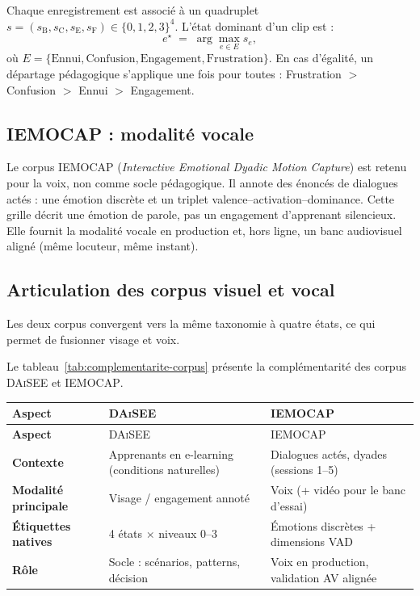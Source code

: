Chaque enregistrement est associé à un quadruplet
$s = (s_{\mathrm{B}}, s_{\mathrm{C}}, s_{\mathrm{E}}, s_{\mathrm{F}})
\in \{0,1,2,3\}^4$.
L'état dominant d'un clip est :
\begin{equation}
  e^{\star} \;=\; \arg\max_{e \in E} s_e,
  \label{eq:etat-dominant}
\end{equation}
où $E = \{\text{Ennui}, \text{Confusion}, \text{Engagement},
\text{Frustration}\}$. En cas d'égalité, un départage pédagogique
s'applique une fois pour toutes :
Frustration $>$ Confusion $>$ Ennui $>$ Engagement.



\subsection{\textsc{IEMOCAP} : modalité vocale}
\label{sec:iemocap}
\label{subsec:iemocap-desc}

Le corpus \textsc{IEMOCAP} (\emph{Interactive Emotional Dyadic Motion
Capture}) \cite{busso2008iemocap} est retenu pour la
voix, non comme socle pédagogique. Il annote des énoncés de
dialogues actés : une émotion discrète et un triplet
valence--activation--dominance. Cette grille décrit une émotion de
parole, pas un engagement d'apprenant silencieux. Elle fournit la
modalité vocale en production et, hors ligne, un banc audiovisuel
aligné (même locuteur, même instant). 

\subsection{Articulation des corpus visuel et vocal}
\label{subsec:iemocap-usage}

Les deux corpus convergent vers la même taxonomie à quatre états, ce qui
permet de fusionner visage et voix.

Le tableau~\ref{tab:complementarite-corpus} présente la complémentarité des corpus \textsc{DAiSEE} et \textsc{IEMOCAP}.

{\small
\renewcommand{\arraystretch}{1.18}
\setlength{\tabcolsep}{4pt}
\begin{xltabular}{\textwidth}{|>{\bfseries}l|X|X|}
\hline
{}
Aspect & \textsc{DAiSEE} & \textsc{IEMOCAP} \\
\hline
\endfirsthead
\hline
{}
Aspect & \textsc{DAiSEE} & \textsc{IEMOCAP} \\
\hline
\endhead
\endfoot
\endlastfoot
Contexte & Apprenants en e-learning (conditions naturelles) &
Dialogues actés, dyades (sessions 1--5) \\
\hline
Modalité principale & Visage / engagement annoté &
Voix (+ vidéo pour le banc d'essai) \\
\hline
Étiquettes natives & 4 états $\times$ niveaux 0--3 &
Émotions discrètes + dimensions VAD \\
\hline
Rôle  &
Socle : scénarios, patterns, décision &
Voix en production, validation AV alignée \\
\hline
\end{xltabular}
\label{tab:complementarite-corpus}
}


